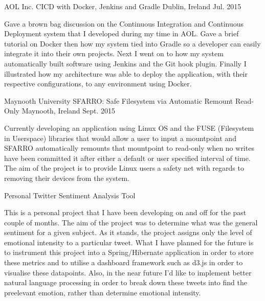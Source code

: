 \begin{cventries}
  \cventry
    {AOL Inc.}
    {CICD with Docker, Jenkins and Gradle}
    {Dublin, Ireland}
    {Jul. 2015}
    {
      \begin{cvitems}
        \item {Gave a brown bag discussion on the Continuous Integration and Continuous Deployment system that I developed during my time in AOL. Gave a brief tutorial on Docker then how my system tied into Gradle so a developer can easily integrate it into their own projects. Next I went on to how my system automatically built software using Jenkins and the Git hook plugin. Finally I illustrated how my architecture was able to deploy the application, with their respective configurations, to any environment using Docker.}
      \end{cvitems}
    }
    \cventry
    {Maynooth University}
    {SFARRO: Safe Filesystem via Automatic Remount Read-Only }
    {Maynooth, Ireland}
    {Sept. 2015}
    {
        \begin{cvitems}
        \item {Currently developing an application using Linux OS and the FUSE (Filesystem in Userspace) libraries that would allow a user to input a mountpoint and SFARRO automatically remounts that mountpoint to read-only when no writes have been committed it after either a default or user specified interval of time. The aim of the project is to provide Linux users a safety net with regards to removing their devices from the system. }
        \end{cvitems}
    }
   \cventry
    {Personal}
    {Twitter Sentiment Analysis Tool }
    {}
    {}
    {
        \begin{cvitems}
        \item {This is a personal project that I have been developing on and off for the past couple of months.
        The aim of the project was to determine what was the general sentiment for a given subject. As it stands, the project assigns only the level of emotional intensity to a particular tweet. What I have planned for the future is to instrument this project into a Spring/Hibernate application in order to store these metrics and to utilise a dashboard framework such as d3.js in order to visualise these datapoints. Also, in the near future I'd like to implement  better natural language processing in order to break down these tweets into find the preelevant emotion, rather than determine emotional intensity.}
        \end{cvitems}
    }
\end{cventries}